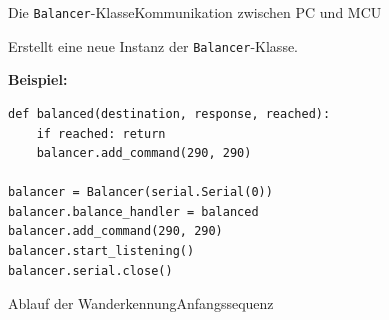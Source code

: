 \documentclass{beamer}
\begin{document}
\begin{frame}[fragile,t]{Die \verb~Balancer~-Klasse}{Kommunikation zwischen PC und MCU}


\smallskip\noindent
Erstellt eine neue Instanz der \verb~Balancer~-Klasse.\\

\medskip\noindent
\textbf{Beispiel:}

\medskip
\begin{verbatim}
def balanced(destination, response, reached):
    if reached: return
    balancer.add_command(290, 290)

balancer = Balancer(serial.Serial(0))
balancer.balance_handler = balanced
balancer.add_command(290, 290)
balancer.start_listening()
balancer.serial.close()
\end{verbatim}
\end{frame}

\begin{frame}[fragile,t]{Ablauf der Wanderkennung}{Anfangssequenz}
\begin{small}
\begin{figure}[h]
  \centering
\end{figure}
\end{small}
\end{frame}
\end{document}
